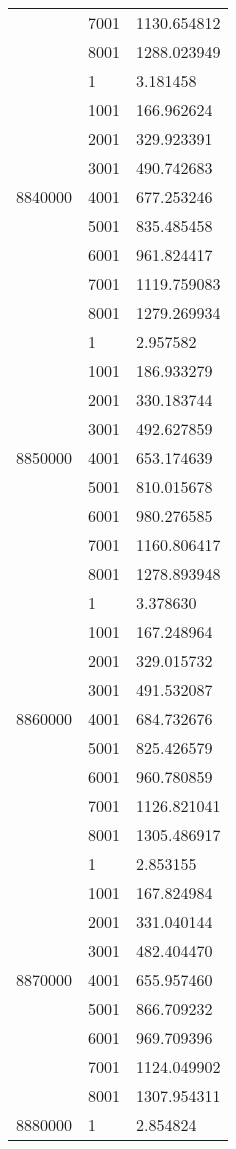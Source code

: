 \begin{table}[htb!]
\begin{tabular}{lll}
 & 7001 & 1130.654812 \\
 & 8001 & 1288.023949 \\
\multirow[c]{9}{*}{8840000} & 1 & 3.181458 \\
 & 1001 & 166.962624 \\
 & 2001 & 329.923391 \\
 & 3001 & 490.742683 \\
 & 4001 & 677.253246 \\
 & 5001 & 835.485458 \\
 & 6001 & 961.824417 \\
 & 7001 & 1119.759083 \\
 & 8001 & 1279.269934 \\
\multirow[c]{9}{*}{8850000} & 1 & 2.957582 \\
 & 1001 & 186.933279 \\
 & 2001 & 330.183744 \\
 & 3001 & 492.627859 \\
 & 4001 & 653.174639 \\
 & 5001 & 810.015678 \\
 & 6001 & 980.276585 \\
 & 7001 & 1160.806417 \\
 & 8001 & 1278.893948 \\
\multirow[c]{9}{*}{8860000} & 1 & 3.378630 \\
 & 1001 & 167.248964 \\
 & 2001 & 329.015732 \\
 & 3001 & 491.532087 \\
 & 4001 & 684.732676 \\
 & 5001 & 825.426579 \\
 & 6001 & 960.780859 \\
 & 7001 & 1126.821041 \\
 & 8001 & 1305.486917 \\
\multirow[c]{9}{*}{8870000} & 1 & 2.853155 \\
 & 1001 & 167.824984 \\
 & 2001 & 331.040144 \\
 & 3001 & 482.404470 \\
 & 4001 & 655.957460 \\
 & 5001 & 866.709232 \\
 & 6001 & 969.709396 \\
 & 7001 & 1124.049902 \\
 & 8001 & 1307.954311 \\
\multirow[c]{9}{*}{8880000} & 1 & 2.854824 \\

\end{tabular}
\end{table}
